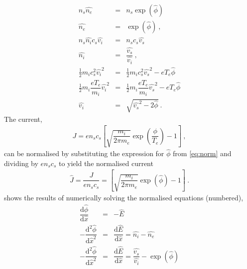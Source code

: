 \documentclass[10pt,a4paper]{article}
\begin{document}
	\begin{subequations}
		\begin{eqnarray} \label{eq:nedicec}
			n_{s} \widehat{n_{e}} &=& n_{s} \exp\left(\hat{\phi}\right) \nonumber\\
			\widehat{n_{e}} &=& \exp\left(\hat{\phi}\right)~, \\
			n_{s} \widehat{n_{i}} c_{s} \widehat{v_{i}} &=& n_{s} c_{s} \widehat{v_{s}} \nonumber\\
			\widehat{n_{i}} &=& \dfrac{\widehat{v_{s}}}{\widehat{v_{i}}}~, \\
			\frac{1}{2} m_{i} c_{s}^{2} \widehat{v_{i}}^{2} &=& \frac{1}{2} m_{i} c_{s}^{2} \widehat{v_{s}}^{2} - e T_{e} \hat{\phi} \nonumber\\
			\frac{1}{2} m_{i} \dfrac{e T_{e}}{m_{i}} \widehat{v_{i}}^{2} &=& \frac{1}{2} m_{i} \dfrac{e T_{e}}{m_{i}} \widehat{v_{s}}^{2} - e T_{e} \hat{\phi} \nonumber\\
			\widehat{v_{i}} &=& \sqrt{\widehat{v_{s}}^{2} - 2 \hat{\phi}}~.
		\end{eqnarray}
	\end{subequations}
	The current,
	\begin{eqnarray} \label{eq:current}
		J = e n_{s} c_{s} \left[ \sqrt{\dfrac{m_{i}}{2 \pi m_{e}}} \exp\left(\dfrac{\phi}{T_{e}}\right) - 1 \right]~,
	\end{eqnarray}
	can be normalised by substituting the expression for $\hat{\phi}$ from \cref{eq:norm} and dividing by $e n_{s} c_{s}$ to yield the normalised current
	\begin{eqnarray} \label{eq:ncurrent}
		\hat{J} = \dfrac{J}{e n_{s} c_{s}} = \left[ \sqrt{\dfrac{m_{i}}{2 \pi m_{e}}} \exp\left(\hat{\phi}\right) - 1 \right]~.
	\end{eqnarray}
	 shows the results of numerically solving the normalised equations (numbered),
	\begin{subequations}
		\begin{eqnarray} \label{eq:derivs}
			\dfrac{\mathrm{d}\hat{\phi}}{\mathrm{d}\hat{x}} &=& -\hat{E} \\
			-\dfrac{\mathrm{d}^{2}\hat{\phi}}{\mathrm{d} \hat{x}^{2}} &=& \dfrac{\mathrm{d} \hat{E}}{\mathrm{d} \hat{x}} = \widehat{n_{i}} - \widehat{n_{e}} \nonumber\\
			-\dfrac{\mathrm{d}^{2}\hat{\phi}}{\mathrm{d} \hat{x}^{2}} &=& \dfrac{\mathrm{d} \hat{E}}{\mathrm{d} \hat{x}} = \dfrac{\widehat{v_{s}}}{\widehat{v_{i}}} - \exp\left(\hat{\phi}\right)
		\end{eqnarray}
	\end{subequations}
\end{document}
